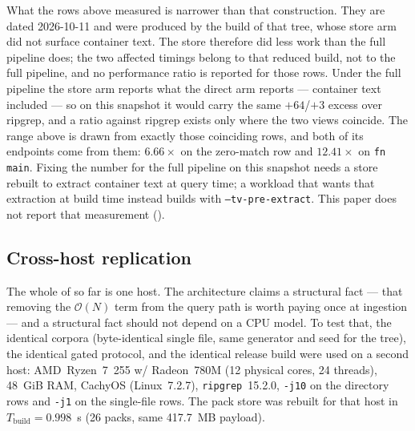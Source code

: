 \documentclass[11pt,letterpaper]{article}
\begin{document}
What the rows above measured is narrower than that construction. They are dated
2026-10-11 and were produced by the build of that tree, whose store arm did
not surface container text. The store therefore did less work than the full
pipeline does; the two affected timings belong to that reduced build, not to the
full pipeline, and no performance ratio is reported for those rows. Under
the full pipeline the store arm reports what the direct arm reports ---
container text included --- so on this snapshot it would carry the same
$+64$/$+3$ excess over ripgrep, and a ratio against ripgrep exists only where
the two views coincide. The range above is drawn from exactly those coinciding
rows, and both of its endpoints come from them: $6.66\times$ on the zero-match
row and $12.41\times$ on \texttt{fn main}. Fixing the number for the full
pipeline on this snapshot needs a store rebuilt to extract container text at
query time; a workload that wants that extraction at build time instead builds
with \texttt{--tv-pre-extract}. This paper does not report that measurement
().

\subsection{Cross-host replication}
\label{sec:eval:cross}
The whole of  so far is one host. The architecture claims a
structural fact --- that removing the $\mathcal{O}(N)$ term from the query
path is worth paying once at ingestion --- and a structural fact should not
depend on a CPU model. To test that, the identical corpora (byte-identical
single file, same generator and seed for the tree), the identical gated
protocol, and the identical release build were used on a second host:
AMD~Ryzen~7~255 w/ Radeon~780M (12 physical cores, 24 threads), 48~GiB RAM, CachyOS
(Linux~7.2.7), \texttt{ripgrep}~15.2.0, \texttt{-j10} on the directory
rows and \texttt{-j1} on the single-file rows. The pack store was rebuilt
for that host in $T_{\text{build}} = 0.998$~s (26 packs, same 417.7~MB
payload).
\end{document}
